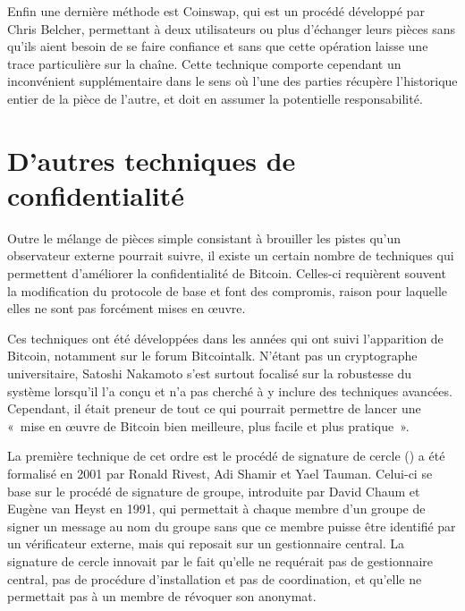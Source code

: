 Enfin une dernière méthode est Coinswap, qui est un procédé développé par Chris Belcher, permettant à deux utilisateurs ou plus d'échanger leurs pièces sans qu'ils aient besoin de se faire confiance et sans que cette opération laisse une trace particulière sur la chaîne. Cette technique comporte cependant un inconvénient supplémentaire dans le sens où l'une des parties récupère l'historique entier de la pièce de l'autre, et doit en assumer la potentielle responsabilité.

\section*{D'autres techniques de confidentialité}


Outre le mélange de pièces simple consistant à brouiller les pistes qu'un observateur externe pourrait suivre, il existe un certain nombre de techniques qui permettent d'améliorer la confidentialité de Bitcoin. Celles-ci requièrent souvent la modification du protocole de base et font des compromis, raison pour laquelle elles ne sont pas forcément mises en œuvre.

Ces techniques ont été développées dans les années qui ont suivi l'apparition de Bitcoin, notamment sur le forum Bitcointalk. N'étant pas un cryptographe universitaire, Satoshi Nakamoto s'est surtout focalisé sur la robustesse du système lorsqu'il l'a conçu et n'a pas cherché à y inclure des techniques avancées. Cependant, il était preneur de tout ce qui pourrait permettre de lancer une «~mise en œuvre de Bitcoin bien meilleure, plus facile et plus pratique~».



La première technique de cet ordre est le procédé de signature de cercle () a été formalisé en 2001 par Ronald Rivest, Adi Shamir et Yael Tauman. Celui-ci se base sur le procédé de signature de groupe, introduite par David Chaum et Eugène van Heyst en 1991, qui permettait à chaque membre d'un groupe de signer un message au nom du groupe sans que ce membre puisse être identifié par un vérificateur externe, mais qui reposait sur un gestionnaire central. La signature de cercle innovait par le fait qu'elle ne requérait pas de gestionnaire central, pas de procédure d'installation et pas de coordination, et qu'elle ne permettait pas à un membre de révoquer son anonymat.

